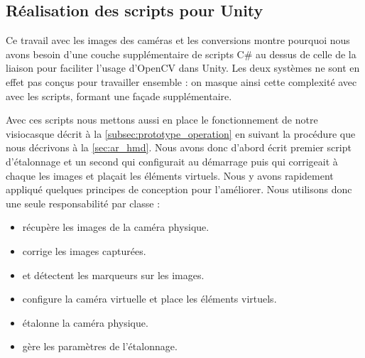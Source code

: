\subsection{Réalisation des scripts pour Unity}
\label{subsec:aruco_unity_scripts}


Ce travail avec les images des caméras et les conversions montre pourquoi nous avons besoin d'une couche supplémentaire de scripts C\# au dessus de celle de la liaison pour faciliter l'usage d'OpenCV dans Unity. Les deux systèmes ne sont en effet pas conçus pour travailler ensemble : on masque ainsi cette complexité avec avec les scripts, formant une façade supplémentaire.

Avec ces scripts nous mettons aussi en place le fonctionnement de notre visiocasque décrit à la \autoref{subsec:prototype_operation} en suivant la procédure que nous décrivons à la \autoref{sec:ar_hmd}. Nous avons donc d'abord écrit premier script d'étalonnage et un second qui configurait au démarrage puis qui corrigeait à chaque  les images et plaçait les éléments virtuels. Nous y avons rapidement appliqué quelques principes de conception pour l'améliorer. Nous utilisons donc une seule responsabilité par classe  :
\begin{itemize}
  \item {} récupère les images de la caméra physique.
  \item {} corrige les images capturées.
  \item {} et  détectent les marqueurs sur les images.
  \item {} configure la caméra virtuelle et place les éléments virtuels.
  \item {} étalonne la caméra physique.
  \item {} gère les paramètres de l'étalonnage.
\end{itemize}
\bigskip

